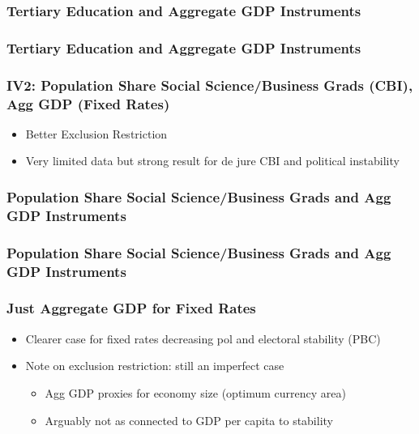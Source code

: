 \documentclass{beamer}
\begin{document}
    \begin{frame}
        \frametitle{Tertiary Education and Aggregate GDP Instruments}
        {
            \let\oldcentering\centering
            \renewcommand\centering{\tiny\oldcentering}
            
        }
    \end{frame}

    \begin{frame}
        \frametitle{Tertiary Education and Aggregate GDP Instruments}
        {
            \let\oldcentering\centering
            \renewcommand\centering{\tiny\oldcentering}
            
        }
    \end{frame}

    \begin{frame}
        \frametitle{IV2: Population Share Social Science/Business Grads (CBI), Agg GDP (Fixed Rates)}
        \begin{itemize}
            \item Better Exclusion Restriction
            \item Very limited data but strong result for de jure CBI and political instability
        \end{itemize}
    \end{frame}

    \begin{frame}
        \frametitle{Population Share Social Science/Business Grads and Agg GDP Instruments}
        {
            \let\oldcentering\centering
            \renewcommand\centering{\tiny\oldcentering}
            
        }
    \end{frame}

    \begin{frame}
        \frametitle{Population Share Social Science/Business Grads and Agg GDP Instruments}
        {
            \let\oldcentering\centering
            \renewcommand\centering{\tiny\oldcentering}
            
        }
    \end{frame}

    \begin{frame}
        \frametitle{Just Aggregate GDP for Fixed Rates}
        \begin{itemize}
            \item Clearer case for fixed rates decreasing pol and electoral stability (PBC)
            \item Note on exclusion restriction: still an imperfect case
            \begin{itemize}
                \item Agg GDP proxies for economy size (optimum currency area)
                \item Arguably not as connected to GDP per capita to stability
            \end{itemize}
        \end{itemize}
    \end{frame}
\end{document}
